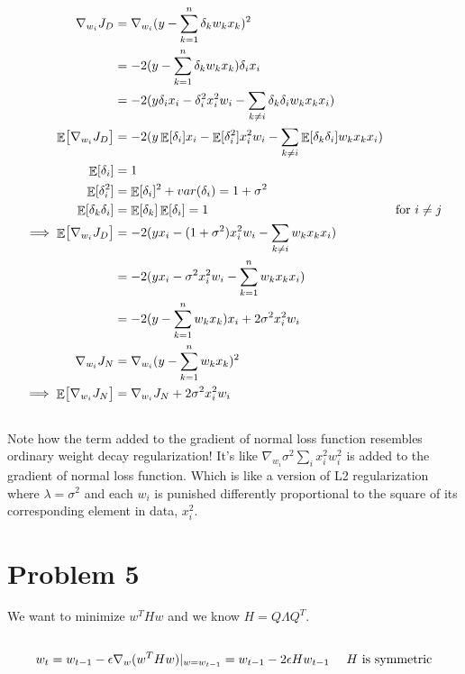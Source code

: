 \documentclass[]{article}
\numberwithin{equation}{section}
\newcommand{\transpose}{^T}
\newcommand{\at}[2][]{#1|_{#2}}
\DeclareMathOperator{\EX}{\mathbb{E}}%
\begin{document}
\subsection{}
\begin{align}
\nabla_{w_i} J_D &= \nabla_{w_i} (y - \sum_{k=1}^n \delta_k w_k x_k)^2\\
&= -2(y - \sum_{k=1}^n \delta_k w_k x_k) \delta_i x_i\\
&= -2(y\delta_i x_i - \delta_i^2 x_i^2 w_i - \sum_{k\neq i} \delta_k \delta_i w_k x_k x_i) \\
\EX\bigl[\nabla_{w_i} J_D\bigr] &= -2(y\EX[\delta_i]x_i - \EX[\delta_i^2] x_i^2 w_i - \sum_{k\neq i} \EX[\delta_k \delta_i] w_k x_k x_i) \\
\EX[\delta_i] &= 1\\
\EX[\delta_i^2] &= \EX[\delta_i]^2 + var(\delta_i) = 1 + \sigma^2\\
\EX[\delta_k \delta_i] &= \EX[\delta_k] \EX[\delta_i] = 1 & \textup{for \(i\neq j\)}\\
\implies \EX\bigl[\nabla_{w_i} J_D\bigr] &= -2(yx_i - (1 + \sigma^2) x_i^2 w_i - \sum_{k\neq i} w_k x_k x_i) \\
&= -2(yx_i - \sigma^2 x_i^2 w_i - \sum_{k=1}^n w_k x_k x_i) \\
&= -2(y - \sum_{k=1}^n w_k x_k) x_i + 2\sigma^2 x_i^2 w_i\\
\nabla_{w_i} J_N &= \nabla_{w_i} (y - \sum_{k=1}^n w_k x_k)^2\\
\implies \EX\bigl[\nabla_{w_i} J_N\bigr] &= \nabla_{w_i} J_N + 2\sigma^2 x_i^2 w_i
\end{align}

\subsection{}
Note how the term added to the gradient of normal loss function resembles ordinary weight decay regularization!
It's like \(\nabla_{w_i}\sigma^2\sum_i x_i^2 w_i^2\) is added to the gradient of normal loss function.
Which is like a version of L2 regularization where \(\lambda = \sigma^2\) and each \(w_i\) is punished differently proportional to the square of its corresponding element in data, \(x_i^2\).

\section{Problem 5}
We want to minimize \(w\transpose H w\) and we know \(H=Q\Lambda Q\transpose\).
\subsection{}
\begin{align}
w_t &= w_{t-1} - \epsilon \nabla_w (w\transpose H w)\at{w=w_{t-1}} = w_{t-1} - 2\epsilon H w_{t-1}\ & H \textup{ is symmetric}
\end{align}
\end{document}
